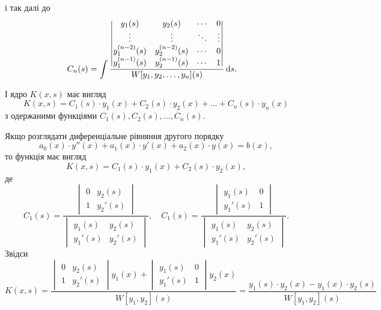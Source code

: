 і так далі до
\begin{align*}
	C_n(s) &= \int \frac{\begin{vmatrix} y_1(s) & y_2(s) & \cdots & 0 \\ \vdots & \vdots & \ddots & \vdots \\ y_1^{(n - 2)}(s) & y_2^{(n - 2)}(s) & \cdots & 0 \\ y_1^{(n - 1)}(s) & y_2^{(n - 1)}(s) & \cdots & 1 \end{vmatrix}}{W[y_1, y_2, \ldots, y_n](s)} \mathop{}\!\mathrm{d} s.
\end{align*}
 
І ядро $K(x, s)$ має вигляд
\begin{equation*}
	K(x, s) = C_1(s) \cdot y_1(x) + C_2(s) \cdot y_2(x) + \ldots + C_n(s) \cdot y_n(x)
\end{equation*}
з одержаними функціями $C_1(s), C_2(s), \ldots, C_n(s)$. \parvskip

Якщо розглядати диференціальне рівняння другого порядку 
\begin{equation*}
	a_0(x) \cdot y''(x) + a_1(x) \cdot y'(x) + a_2(x) \cdot y(x) = b(x),
\end{equation*}
то функція  має вигляд
\begin{equation*}
	K(x, s) = C_1(s) \cdot y_1(x) + C_2(s) \cdot y_2(x),
\end{equation*}
де
\begin{equation*}
	C_1(s) = \frac{\begin{vmatrix} 0 & y_2(s) \\ 1 & y_2'(s) \end{vmatrix}}{\begin{vmatrix} y_1(s) & y_2(s) \\ y_1'(s) & y_2'(s) \end{vmatrix}}, \quad C_1(s) = \frac{\begin{vmatrix} y_1(s) & 0 \\ y_1'(s) & 1 \end{vmatrix}}{\begin{vmatrix} y_1(s) & y_2(s) \\ y_1'(s) & y_2'(s) \end{vmatrix}}.
\end{equation*}
Звідси
\begin{equation*}
	K(x, s) = \frac{\begin{vmatrix} 0 & y_2(s) \\ 1 & y_2'(s) \end{vmatrix} y_1(x) + \begin{vmatrix} y_1(s) & 0 \\ y_1'(s) & 1 \end{vmatrix} y_2(x) }{W[y_1, y_2](s)} = \frac{y_1(s) \cdot y_2(x) - y_1(x) \cdot y_2(s)}{W[y_1, y_2](s)}
\end{equation*}